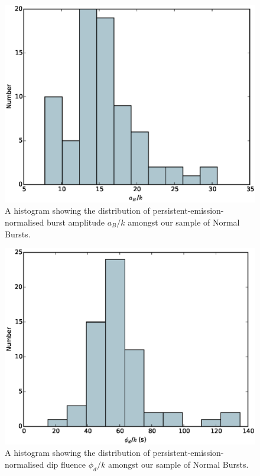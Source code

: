 \begin{figure}
  \centering
  \includegraphics[width=.9\linewidth, trim={0cm 0 0cm 0},clip]{images/appendix_burst_pa_n_hist.eps}
  \caption{\small A histogram showing the distribution of persistent-emission-normalised burst amplitude $a_B/k$ amongst our sample of Normal Bursts.}
  \label{fig:app_hist_ab_n}
\end{figure}

\begin{figure}
  \centering
  \includegraphics[width=.9\linewidth, trim={0cm 0 0cm 0},clip]{images/appendix_dip_aafluence_n_hist.eps}
  \caption{\small A histogram showing the distribution of persistent-emission-normalised dip fluence $\phi_d/k$ amongst our sample of Normal Bursts.}
  \label{fig:app_hist_phid_n}
\end{figure}


